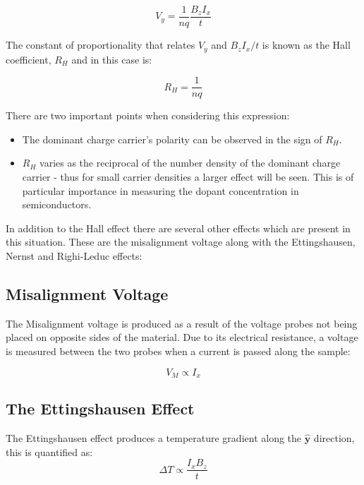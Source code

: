 \documentclass{article}
\newcommand{\supercite}[1]{\textsuperscript{\cite{#1}}}
\begin{document}
		\begin{equation} \label{eq:hallEffect}
			V_y = \frac{1}{nq}\frac{B_zI_x}{t}
		\end{equation}
		
		\noindent The constant of proportionality that relates $V_y$ and $B_zI_x/t$ is known as the Hall coefficient, $R_H$ and in this case is:
		
		\begin{equation}
			R_H = \frac{1}{nq}
		\end{equation}
		
		\noindent There are two important points when considering this expression:
		
		\begin{itemize}
			\item The dominant charge carrier's polarity can be observed in the sign of $R_H$.
			\item $R_H$ varies as the reciprocal of the number density of the dominant charge carrier - thus for small carrier densities a larger effect will be seen. This is of particular importance in measuring the dopant concentration in semiconductors.
		\end{itemize}
		
		In addition to the Hall effect there are several other effects which are present in this situation. These are the misalignment voltage along with the Ettingshausen, Nernst and Righi-Leduc effects:
		
		\subsection{Misalignment Voltage}
			The Misalignment voltage is produced as a result of the voltage probes not being placed on opposite sides of the material. Due to its electrical resistance, a voltage is measured between the two probes when a current is passed along the sample:
			
			\begin{equation}
				V_M \propto I_x
			\end{equation}
		
		\subsection{The Ettingshausen Effect}
			The Ettingshausen effect produces a temperature gradient along the $\hat{\mathbf{y}}$ direction, this is quantified as\supercite{lindbergHall}:
			\begin{equation}
				\Delta T \propto \frac{I_xB_z}{t}
			\end{equation}
			
\end{document}
